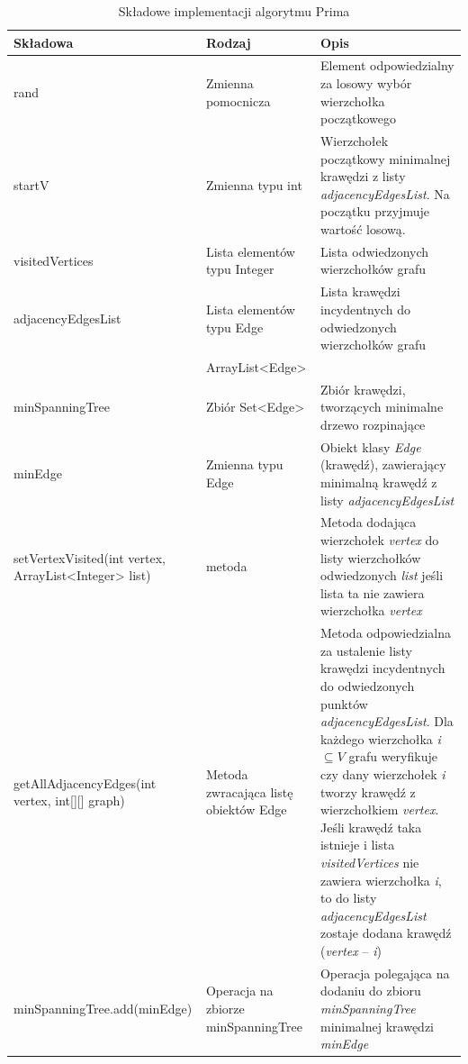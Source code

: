 \begin{table}[!hbp]
	\hspace{-60pt}
	\begin{tabular}{|C{5cm}|C{3cm}|C{9cm}|} \hline
		\textbf{Składowa}& \textbf{Rodzaj}& \textbf{Opis}\\ \hline
		rand & Zmienna pomocnicza  & Element odpowiedzialny za losowy wybór wierzchołka początkowego\\ \hline
		startV & Zmienna typu int  & Wierzchołek początkowy minimalnej krawędzi z listy \emph{adjacencyEdgesList}. Na początku przyjmuje wartość losową. \\ \hline
		visitedVertices & Lista elementów typu Integer  & Lista odwiedzonych wierzchołków grafu\\ \hline
		adjacencyEdgesList & Lista elementów typu Edge& Lista krawędzi incydentnych do odwiedzonych wierzchołków grafu\\
		&ArrayList<Edge>&\\ \hline
		minSpanningTree & Zbiór Set<Edge>  & Zbiór krawędzi, tworzących minimalne drzewo rozpinające\\ \hline
		minEdge & Zmienna typu Edge  & Obiekt klasy \emph{ Edge} (krawędź), zawierający minimalną krawędź  z listy \emph{adjacencyEdgesList} \\ \hline
		setVertexVisited(int vertex, ArrayList<Integer> list) & metoda & Metoda dodająca wierzchołek \emph{vertex} do listy wierzchołków odwiedzonych \emph{list} jeśli lista ta nie zawiera wierzchołka \emph{vertex}\\ \hline
		getAllAdjacencyEdges(int vertex, int[][] graph) & Metoda zwracająca listę obiektów Edge  & Metoda odpowiedzialna za ustalenie listy krawędzi incydentnych do odwiedzonych punktów \emph{adjacencyEdgesList}. Dla każdego wierzchołka \emph{i} $\subseteq V$ grafu weryfikuje czy dany wierzchołek \emph{i} tworzy krawędź z wierzchołkiem \emph{vertex}. Jeśli krawędź taka istnieje i lista \emph{visitedVertices} nie zawiera wierzchołka \emph{i}, to do listy \emph{adjacencyEdgesList} zostaje dodana krawędź (\emph{vertex} -- \emph{i})\\ \hline
		minSpanningTree.add(minEdge) & Operacja na zbiorze minSpanningTree & Operacja polegająca na dodaniu do zbioru \emph{minSpanningTree} minimalnej krawędzi \emph{minEdge}\\ \hline
	\end{tabular}
	\caption{Składowe implementacji algorytmu Prima}
	\label{skladowe}
\end{table}
\newpage
